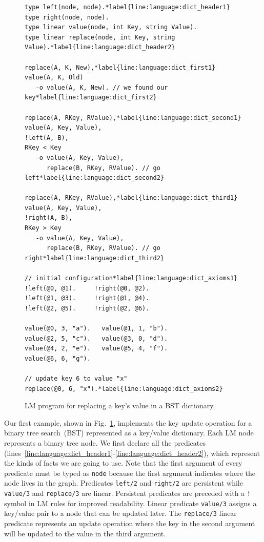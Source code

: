 
\begin{figure}[ht]
\begin{Verbatim}[numbers=right,fontsize=\codesize,commandchars=\*\{\}]
type left(node, node).*label{line:language:dict_header1}
type right(node, node).
type linear value(node, int Key, string Value).
type linear replace(node, int Key, string Value).*label{line:language:dict_header2}

replace(A, K, New),*label{line:language:dict_first1}
value(A, K, Old)
   -o value(A, K, New). // we found our key*label{line:language:dict_first2}

replace(A, RKey, RValue),*label{line:language:dict_second1}
value(A, Key, Value),
!left(A, B),
RKey < Key
   -o value(A, Key, Value),
      replace(B, RKey, RValue). // go left*label{line:language:dict_second2}

replace(A, RKey, RValue),*label{line:language:dict_third1}
value(A, Key, Value),
!right(A, B),
RKey > Key
   -o value(A, Key, Value),
      replace(B, RKey, RValue). // go right*label{line:language:dict_third2}

// initial configuration*label{line:language:dict_axioms1}
!left(@0, @1).     !right(@0, @2).
!left(@1, @3).     !right(@1, @4). 
!left(@2, @5).     !right(@2, @6).

value(@0, 3, "a").   value(@1, 1, "b").
value(@2, 5, "c").   value(@3, 0, "d").
value(@4, 2, "e").   value(@5, 4, "f").
value(@6, 6, "g").

// update key 6 to value "x"
replace(@0, 6, "x").*label{line:language:dict_axioms2}
\end{Verbatim}
\caption{LM program for replacing a key's value in a BST dictionary.}
\label{code:btree_replace}
\end{figure}

Our first example, shown in Fig.~\ref{code:btree_replace}, implements the key
update operation for a binary tree search~(BST) represented as a key/value
dictionary. Each LM node represents a binary tree node. We first declare all the
predicates
(lines~\ref{line:language:dict_header1}-\ref{line:language:dict_header2}), which
represent the kinds of facts we are going to use. Note that the first argument
of every predicate must be typed as \texttt{node} because the first argument
indicates where the node lives in the graph. Predicates \texttt{left/2} and
\texttt{right/2} are persistent while \texttt{value/3} and \texttt{replace/3}
are linear. Persistent predicates are preceded with a \texttt{!} symbol in LM
rules for improved readability. Linear predicate \texttt{value/3} assigns a
key/value pair to a node that can be updated later.  The \texttt{replace/3}
linear predicate represents an update operation where the key in the second
argument will be updated to the value in the third argument.

